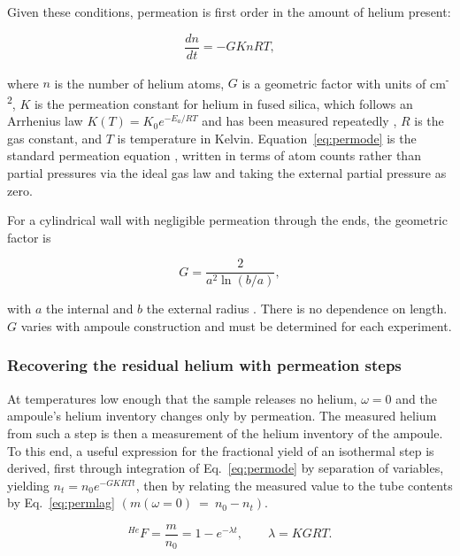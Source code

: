 Given these conditions, permeation is first order in the amount of helium present:

\begin{equation}
\label{eq:permode}
\frac{dn}{dt} = -GKnRT ,
\end{equation}
 
where $n$ is the number of helium atoms, $G$ is a geometric factor with units of cm\textsuperscript{-2}, $K$ is the permeation constant for helium in fused silica, which follows an Arrhenius law $K(T) = K_{0}e^{-E_{a}/RT}$ and has been measured repeatedly \citep{norton1953,altemose1961,swets1961,masaryk1968}, $R$ is the gas constant, and $T$ is temperature in Kelvin. Equation~\eqref{eq:permode} is the standard permeation equation \citep{norton1953,altemose1961,swets1961,masaryk1968}, written in terms of atom counts rather than partial pressures via the ideal gas law and taking the external partial pressure as zero. 

For a cylindrical wall with negligible permeation through the ends, the geometric factor is 

\begin{equation}
\label{eq:geomfactor}
G = \frac{2}{a^{2}\ln(b/a)} ,
\end{equation}

with $a$ the internal and $b$ the external radius \citep{masaryk1968}. There is no dependence on length. $G$ varies with ampoule construction and must be determined for each experiment.

\subsubsection{Recovering the residual helium with permeation steps}\label{sec:permeation-steps}

At temperatures low enough that the sample releases no helium, $\omega = 0$ and the ampoule's helium inventory changes only by permeation. The measured helium from such a step is then a measurement of the helium inventory of the ampoule. To this end, a useful expression for the fractional yield of an isothermal step is derived, first through integration of Eq.~\eqref{eq:permode} by separation of variables, yielding $n_t = n_0e^{-GKRTt}$, then by relating the measured value to the tube contents by Eq.~\eqref{eq:permlag} $\left(m(\omega=0)~=~n_0-n_t\right)$.

\begin{equation}
\label{eq:permsol}
^{He}F = \frac{m}{n_{0}} = 1 - e^{-\lambda t} , \qquad \lambda = KGRT .
\end{equation}

